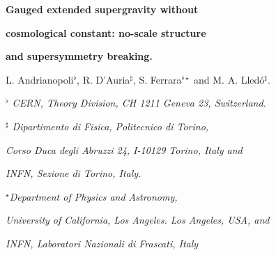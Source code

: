 \documentclass[a4paper,12pt]{article}
\begin{document}


\newcommand{\R}{\mathbb{R}}
\newcommand{\C}{\mathbb{C}}
\newcommand{\Z}{\mathbb{Z}}
\newcommand{\Hb}{\mathbb{H}}

\newcommand{\rE}{\mathrm{E}}
\newcommand{\rSp}{\mathrm{Sp}}
\newcommand{\rSO}{\mathrm{SO}}
\newcommand{\rSL}{\mathrm{SL}}
\newcommand{\rSU}{\mathrm{SU}}
\newcommand{\rUSp}{\mathrm{USp}}
\newcommand{\rU}{\mathrm{U}}
\newcommand{\rF}{\mathrm{F}}
\newcommand{\rGL}{\mathrm{GL}}
\newcommand{\rG}{\mathrm{G}}
\newcommand{\rK}{\mathrm{K}}


\newcommand{\fgl}{\mathfrak{gl}}
\newcommand{\fu}{\mathfrak{u}}
\newcommand{\fsl}{\mathfrak{sl}}
\newcommand{\fsp}{\mathfrak{sp}}
\newcommand{\fusp}{\mathfrak{usp}}
\newcommand{\fsu}{\mathfrak{su}}
\newcommand{\fp}{\mathfrak{p}}
\newcommand{\fso}{\mathfrak{so}}
\newcommand{\fl}{\mathfrak{l}}
\newcommand{\fg}{\mathfrak{g}}
\newcommand{\fr}{\mathfrak{r}}
\newcommand{\fe}{\mathfrak{e}}
\newcommand{\ft}{\mathfrak{t}}







\vskip 1cm


  \centerline{\LARGE \bf Gauged extended supergravity without }

  \bigskip

   \centerline{\LARGE \bf   cosmological constant: no-scale structure }
    \bigskip

   \centerline{\LARGE \bf   and supersymmetry breaking.}





 \vskip 1.5cm
\centerline{L. Andrianopoli$^\flat$, R. D'Auria$^\sharp$,  S.
Ferrara$^{\flat \star}$ and M. A. Lled\'o$^\sharp$.}

\vskip 1cm

\centerline{\it $^\flat$ CERN, Theory Division, CH 1211 Geneva 23,
Switzerland.}

\bigskip



\centerline{\it $^\sharp$ Dipartimento di Fisica, Politecnico di
Torino,} \centerline{\it Corso Duca degli Abruzzi 24, I-10129
Torino, Italy  and  } \centerline{\it   INFN, Sezione di Torino,
Italy. }

\bigskip




\centerline{$^\star$\it Department of Physics and Astronomy,} \centerline{\it University of
California,
Los Angeles. Los Angeles, USA, and} \centerline{\it INFN, Laboratori
Nazionali di
Frascati, Italy}
\end{document}
